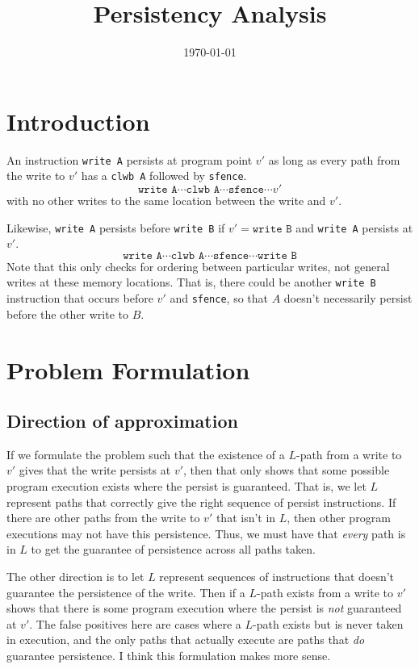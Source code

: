 \documentclass[11pt]{article}
\title{Persistency Analysis}
\author{}
\date{\today}
\begin{document}
\maketitle

\section{Introduction}
An instruction \texttt{write A} persists at program point $v'$ as long as every path from the write to $v'$ has a \texttt{clwb A} followed by \texttt{sfence}.
\[\texttt{write A} \cdots \texttt{clwb A} \cdots \texttt{sfence} \cdots v'\]
with no other writes to the same location between the write and $v'$.

Likewise, \texttt{write A} persists before \texttt{write B} if $v'=\texttt{write B}$ and \texttt{write A} persists at $v'$.
\[\texttt{write A} \cdots \texttt{clwb A} \cdots \texttt{sfence} \cdots \texttt{write B}\]
Note that this only checks for ordering between particular writes, not general writes at these memory locations. That is, there could be another \texttt{write B} instruction that occurs before $v'$ and \texttt{sfence}, so that $A$ doesn't necessarily persist before the other write to $B$.

\section{Problem Formulation}
\subsection{Direction of approximation}
If we formulate the problem such that the existence of a $L$-path from a write to $v'$ gives that the write persists at $v'$, then that only shows that some possible program execution exists where the persist is guaranteed. That is, we let $L$ represent paths that correctly give the right sequence of persist instructions. If there are other paths from the write to $v'$ that isn't in $L$, then other program executions may not have this persistence. Thus, we must have that \textit{every} path is in $L$ to get the guarantee of persistence across all paths taken.

The other direction is to let $L$ represent sequences of instructions that doesn't guarantee the persistence of the write. Then if a $L$-path exists from a write to $v'$ shows that there is some program execution where the persist is \textit{not} guaranteed at $v'$. The false positives here are cases where a $L$-path exists but is never taken in execution, and the only paths that actually execute are paths that \textit{do} guarantee persistence. I think this formulation makes more sense.
\end{document}
